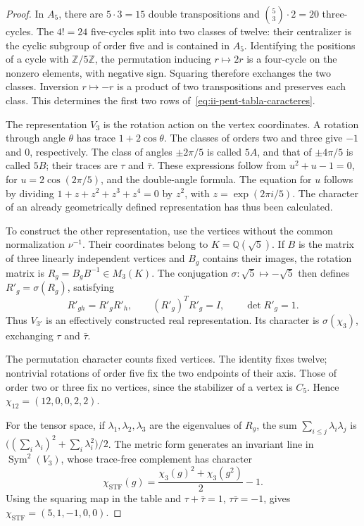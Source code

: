 \begin{proof}
In \(A_5\), there are \(5\cdot3=15\) double transpositions and
\(\binom53\cdot2=20\) three-cycles.
The \(4!=24\) five-cycles split into two classes of
twelve: their centralizer is the cyclic subgroup of order five and is
contained in \(A_5\). Identifying the positions of a cycle
with \(\mathbb Z/5\mathbb Z\), the permutation inducing
\(r\mapsto2r\) is a four-cycle on the nonzero
elements, with negative sign. Squaring therefore exchanges the two
classes. Inversion \(r\mapsto-r\) is a product of two
transpositions and preserves each class. This determines the first two
rows of~\eqref{eq:ii-pent-tabla-caracteres}.

The representation \(V_3\) is the rotation action on the
vertex coordinates. A rotation through angle \(\theta\)
has trace \(1+2\cos\theta\). The classes of orders two and three
give \(-1\) and \(0\), respectively. The class of angles \(\pm2\pi/5\)
is called \(5A\), and that of
\(\pm4\pi/5\) is called \(5B\); their traces are \(\tau\) and \(\bar\tau\).
These expressions follow from
\(u^2+u-1=0\), for \(u=2\cos(2\pi/5)\), and the double-angle
formula. The equation for \(u\) follows by dividing
\(1+z+z^2+z^3+z^4=0\) by \(z^2\), with
\(z=\exp(2\pi i/5)\). The character of an already geometrically
defined representation has thus been calculated.

To construct the other representation, use the vertices without the
common normalization \(\nu^{-1}\). Their coordinates belong to
\(K=\mathbb Q(\sqrt5)\). If \(B\) is the matrix of three linearly
independent vertices and \(B_g\) contains their images, the
rotation matrix is \(R_g=B_gB^{-1}\in M_3(K)\).
The conjugation \(\sigma:\sqrt5\mapsto-\sqrt5\) then defines
\(R'_g=\sigma(R_g)\), satisfying
\[
 R'_{gh}=R'_gR'_h,\qquad
 (R'_g)^TR'_g=I,\qquad \det R'_g=1.
\]
Thus \(V_{3'}\) is an effectively constructed real
representation. Its character is \(\sigma(\chi_3)\), exchanging
\(\tau\) and \(\bar\tau\).

The permutation character counts fixed vertices. The identity fixes
twelve; nontrivial rotations of order five fix the two endpoints
of their axis. Those of order two or three fix no vertices, since the
stabilizer of a vertex is \(C_5\). Hence
\(\chi_{12}=(12,0,0,2,2)\).

For the tensor space, if \(\lambda_1,\lambda_2,\lambda_3\)
are the eigenvalues of \(R_g\), the sum
\(\sum_{i\leq j}\lambda_i\lambda_j\) is
\(\bigl((\sum_i\lambda_i)^2+\sum_i\lambda_i^2\bigr)/2\).
The metric form generates an invariant line in
\(\operatorname{Sym}^2(V_3)\), whose trace-free complement has
character
\begin{equation}
\label{eq:ii-pent-caracter-stf}
 \chi_{\mathrm{STF}}(g)
 =\frac{\chi_3(g)^2+\chi_3(g^2)}2-1.
\end{equation}
Using the squaring map in the table and
\(\tau+\bar\tau=1\), \(\tau\bar\tau=-1\), gives
\(\chi_{\mathrm{STF}}=(5,1,-1,0,0)\).


\end{proof}

